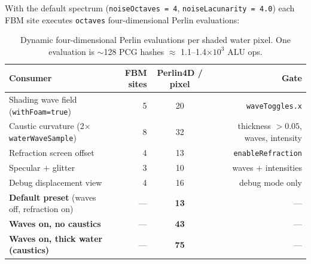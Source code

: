 \documentclass[11pt,a4paper]{article}
\begin{document}
With the default spectrum (\texttt{noiseOctaves = 4}, \texttt{noiseLacunarity = 4.0}) each FBM site executes
\texttt{octaves} four-dimensional Perlin evaluations:

\begin{table}[h]
\centering
\small
\begin{tabular}{@{}lrcr@{}}
\toprule
\textbf{Consumer} & \textbf{FBM sites} & \textbf{Perlin4D / pixel} & \textbf{Gate} \\
\midrule
Shading wave field (\texttt{withFoam=true}) & 5 & 20 & \texttt{waveToggles.x} \\
Caustic curvature (2$\times$ \texttt{waterWaveSample}) & 8 & 32 & thickness $>0.05$, waves, intensity \\
Refraction screen offset & 4 & 13 & \texttt{enableRefraction} \\
Specular $+$ glitter & 3 & 10 & waves $+$ intensities \\
Debug displacement view & 4 & 16 & debug mode only \\
\midrule
\textbf{Default preset} (waves off, refraction on) & --- & \textbf{13} & --- \\
\textbf{Waves on, no caustics} & --- & \textbf{43} & --- \\
\textbf{Waves on, thick water (caustics)} & --- & \textbf{75} & --- \\
\bottomrule
\end{tabular}
\caption{Dynamic four-dimensional Perlin evaluations per shaded water pixel. One evaluation is $\sim$128 PCG hashes
$\approx$ 1.1--1.4$\times10^3$ ALU ops.}
\end{table}
\end{document}
